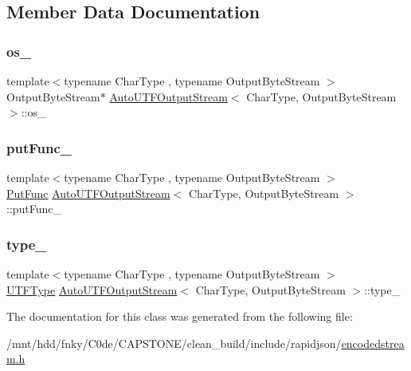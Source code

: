 \subsection{Member Data Documentation}
\mbox{\label{classAutoUTFOutputStream_a723efb60d9fdb46e6094db891d24a509}} 
\subsubsection{\texorpdfstring{os\+\_\+}{os\_}}
{\footnotesize\ttfamily template$<$typename Char\+Type , typename Output\+Byte\+Stream $>$ \\
Output\+Byte\+Stream$\ast$ \hyperlink{classAutoUTFOutputStream}{Auto\+U\+T\+F\+Output\+Stream}$<$ Char\+Type, Output\+Byte\+Stream $>$\+::os\+\_\+\hspace{0.3cm}{\ttfamily [private]}}

\mbox{\label{classAutoUTFOutputStream_af15ae56768d0f65b5938eab255493274}} 
\subsubsection{\texorpdfstring{put\+Func\+\_\+}{putFunc\_}}
{\footnotesize\ttfamily template$<$typename Char\+Type , typename Output\+Byte\+Stream $>$ \\
\hyperlink{classAutoUTFOutputStream_a398450792738ee1cb865fc96dfde9e1a}{Put\+Func} \hyperlink{classAutoUTFOutputStream}{Auto\+U\+T\+F\+Output\+Stream}$<$ Char\+Type, Output\+Byte\+Stream $>$\+::put\+Func\+\_\+\hspace{0.3cm}{\ttfamily [private]}}

\mbox{\label{classAutoUTFOutputStream_a767a11d3801e410881972013376d69eb}} 
\subsubsection{\texorpdfstring{type\+\_\+}{type\_}}
{\footnotesize\ttfamily template$<$typename Char\+Type , typename Output\+Byte\+Stream $>$ \\
\hyperlink{encodings_8h_ac9448aedf514a5bb509bae73a9ce4e58}{U\+T\+F\+Type} \hyperlink{classAutoUTFOutputStream}{Auto\+U\+T\+F\+Output\+Stream}$<$ Char\+Type, Output\+Byte\+Stream $>$\+::type\+\_\+\hspace{0.3cm}{\ttfamily [private]}}



The documentation for this class was generated from the following file\+:\begin{DoxyCompactItemize}
\item 
/mnt/hdd/fnky/\+C0de/\+C\+A\+P\+S\+T\+O\+N\+E/clean\+\_\+build/include/rapidjson/\hyperlink{encodedstream_8h}{encodedstream.\+h}\end{DoxyCompactItemize}
